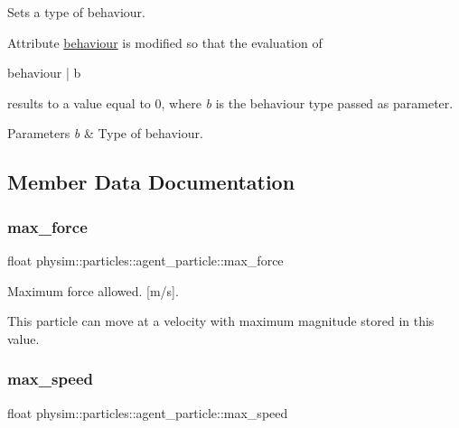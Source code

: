 Sets a type of behaviour. 

Attribute \hyperlink{classphysim_1_1particles_1_1agent__particle_af219e3f46630bb7f51f3d00952ed4f1c}{behaviour} is modified so that the evaluation of \begin{DoxyVerb}behaviour | b
\end{DoxyVerb}
 results to a value equal to 0, where {\itshape b} is the behaviour type passed as parameter. 
\begin{DoxyParams}{Parameters}
{\em b} & Type of behaviour. \\
\hline
\end{DoxyParams}


\subsection{Member Data Documentation}
\mbox{\label{classphysim_1_1particles_1_1agent__particle_a57909cb85564f4432754000ed570d88a}} 
\subsubsection{\texorpdfstring{max\+\_\+force}{max\_force}}
{\footnotesize\ttfamily float physim\+::particles\+::agent\+\_\+particle\+::max\+\_\+force}



Maximum force allowed. \mbox{[}m/s\mbox{]}. 

This particle can move at a velocity with maximum magnitude stored in this value. \mbox{\label{classphysim_1_1particles_1_1agent__particle_a3e34a9a7fc82cbad0226b7b925b5ba22}} 
\subsubsection{\texorpdfstring{max\+\_\+speed}{max\_speed}}
{\footnotesize\ttfamily float physim\+::particles\+::agent\+\_\+particle\+::max\+\_\+speed}



